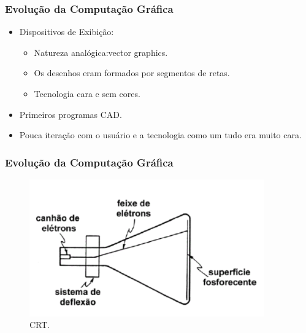 \documentclass{beamer}
\begin{document}


\begin{frame}
\frametitle{Evolução da Computação Gráfica}

\begin{block}

	\begin{itemize}
		\item<1-> Dispositivos de Exibição:
		\begin{itemize}
			\item<1-> Natureza analógica:vector graphics.
			\item<1-> Os desenhos eram formados por segmentos de retas.
			\item<1-> Tecnologia cara e sem cores.
		\end{itemize}
		\item<1-> Primeiros programas CAD.
		\item<1-> Pouca iteração com o usuário e a tecnologia como um tudo era muito cara.
	
	\end{itemize}
\end{block}

\end{frame}



\begin{frame}
\frametitle{Evolução da Computação Gráfica}

	\begin{figure}[!h]
		\begin{center}
			\includegraphics[width=0.9\textwidth]{Figures/crt}
			\caption{CRT.}
		\end{center}
		
	\end{figure}

\end{frame}
\end{document}
